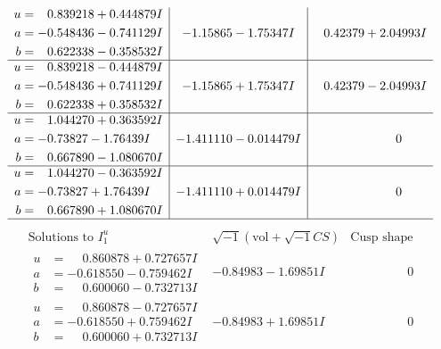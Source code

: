 \documentclass[1p]{elsarticle_modified}
\theoremstyle{definition}
\newcommand{\I}{\sqrt{-1}}
\begin{document}
$$\begin{array}{c|c|c}
\begin{aligned}
u &= \phantom{-}0.839218 + 0.444879 I \\
a &= -0.548436 - 0.741129 I \\
b &= \phantom{-}0.622338 - 0.358532 I\end{aligned}
 & -1.15865 - 1.75347 I & \phantom{-}0.42379 + 2.04993 I \\ \hline\begin{aligned}
u &= \phantom{-}0.839218 - 0.444879 I \\
a &= -0.548436 + 0.741129 I \\
b &= \phantom{-}0.622338 + 0.358532 I\end{aligned}
 & -1.15865 + 1.75347 I & \phantom{-}0.42379 - 2.04993 I \\ \hline\begin{aligned}
u &= \phantom{-}1.044270 + 0.363592 I \\
a &= -0.73827 - 1.76439 I \\
b &= \phantom{-}0.667890 - 1.080670 I\end{aligned}
 & -1.411110 - 0.014479 I & \phantom{-0.000000 } 0 \\ \hline\begin{aligned}
u &= \phantom{-}1.044270 - 0.363592 I \\
a &= -0.73827 + 1.76439 I \\
b &= \phantom{-}0.667890 + 1.080670 I\end{aligned}
 & -1.411110 + 0.014479 I & \phantom{-0.000000 } 0\\
 \hline 
 \end{array}$$\newpage$$\begin{array}{c|c|c}  
\text{Solutions to }I^u_{1}& \I (\text{vol} + \sqrt{-1}CS) & \text{Cusp shape}\\
 \hline 
\begin{aligned}
u &= \phantom{-}0.860878 + 0.727657 I \\
a &= -0.618550 - 0.759462 I \\
b &= \phantom{-}0.600060 - 0.732713 I\end{aligned}
 & -0.84983 - 1.69851 I & \phantom{-0.000000 } 0 \\ \hline\begin{aligned}
u &= \phantom{-}0.860878 - 0.727657 I \\
a &= -0.618550 + 0.759462 I \\
b &= \phantom{-}0.600060 + 0.732713 I\end{aligned}
 & -0.84983 + 1.69851 I & \phantom{-0.000000 } 0 \\ \hline\begin{aligned}

\end{aligned}
\end{array}$$
\end{document}
